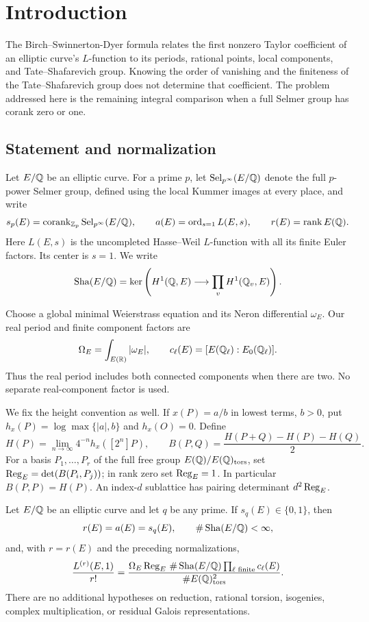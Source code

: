 \section{Introduction}\label{sec:intro}

The Birch--Swinnerton-Dyer formula relates the first nonzero Taylor
coefficient of an elliptic curve's $L$-function to its periods, rational
points, local components, and Tate--Shafarevich group. Knowing the order
of vanishing and the finiteness of the Tate--Shafarevich group does not
determine that coefficient. The problem addressed here is the remaining
integral comparison when a full Selmer group has corank zero or one.

\subsection{Statement and normalization}

Let $E/\mathbb Q$ be an elliptic curve. For a prime $p$, let
$\operatorname{Sel}_{p^\infty}(E/\mathbb Q)$ denote the full $p$-power Selmer group, defined
using the local Kummer images at every place, and write
\[
 s_p(E)=\operatorname{corank}_{\mathbb Z_p}\operatorname{Sel}_{p^\infty}(E/\mathbb Q),\qquad
 a(E)=\operatorname{ord}_{s=1}L(E,s),\qquad r(E)=\operatorname{rank} E(\mathbb Q).
\]
Here $L(E,s)$ is the uncompleted Hasse--Weil $L$-function with all its
finite Euler factors. Its center is $s=1$. We write
\[
 \operatorname{Sha}(E/\mathbb Q)=\ker\left(H^1(\mathbb Q,E)\longrightarrow
                          \prod_v H^1(\mathbb Q_v,E)\right).
\]

Choose a global minimal Weierstrass equation and its Neron differential
$\omega_E$. Our real period and finite component factors are
\[
 \Omega_E=\int_{E(\mathbb R)}|\omega_E|,
 \qquad c_\ell(E)=[E(\mathbb Q_\ell):E_0(\mathbb Q_\ell)].
\]
Thus the real period includes both connected components when there are
two. No separate real-component factor is used.

We fix the height convention as well. If $x(P)=a/b$ in lowest terms,
$b>0$, put $h_x(P)=\log\max\{|a|,b\}$ and $h_x(O)=0$. Define
\begin{equation}\label{eq:height-convention}
 H(P)=\lim_{n\to\infty}4^{-n}h_x([2^n]P),\qquad
 B(P,Q)=\frac{H(P+Q)-H(P)-H(Q)}2.
\end{equation}
For a basis $P_1,\ldots,P_r$ of the full free group
$E(\mathbb Q)/E(\mathbb Q)_{\rm tors}$, set
$\operatorname{Reg}_E=\det(B(P_i,P_j))$; in rank zero set $\operatorname{Reg}_E=1$.
In particular $B(P,P)=H(P)$. An index-$d$ sublattice has pairing
determinant $d^2\operatorname{Reg}_E$.

\begin{theorem}\label{thm:main}
Let $E/\mathbb Q$ be an elliptic curve and let $q$ be any prime. If
$s_q(E)\in\{0,1\}$, then
\[
 r(E)=a(E)=s_q(E),\qquad \#\operatorname{Sha}(E/\mathbb Q)<\infty,
\]
and, with $r=r(E)$ and the preceding normalizations,
\begin{equation}\label{eq:bsd-main}
 \frac{L^{(r)}(E,1)}{r!}
 =\frac{\Omega_E\operatorname{Reg}_E\,\#\operatorname{Sha}(E/\mathbb Q)
                  \prod_{\ell\text{ finite}}c_\ell(E)}
              {\#E(\mathbb Q)_{\rm tors}^{2}}.
\end{equation}
There are no additional hypotheses on reduction, rational torsion,
isogenies, complex multiplication, or residual Galois representations.
\end{theorem}

